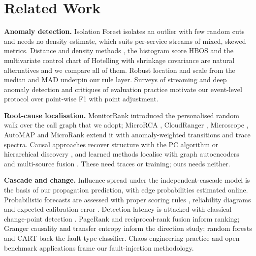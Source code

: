 \documentclass[journal]{IEEEtran}
\begin{document}
\section{Related Work}
\textbf{Anomaly detection.} Isolation Forest \cite{liu2008isolation,liu2012isolation} isolates an outlier with few random cuts
and needs no density estimate, which suits per-service streams of mixed, skewed metrics. Distance and density methods
\cite{ramaswamy2000efficient,breunig2000lof}, the histogram score HBOS \cite{goldstein2012hbos} and the multivariate control chart
of Hotelling \cite{hotelling1931,mahalanobis1936} with shrinkage covariance \cite{ledoit2004} are natural alternatives and we compare
all of them. Robust location and scale from the median and MAD \cite{hampel1974,rousseeuw1993} underpin our rule layer. Surveys of
streaming and deep anomaly detection \cite{gama2014survey,chandola2009survey} and critiques of evaluation practice
\cite{wu2021flawed,kim2022rigorous,tatbul2018precision} motivate our event-level protocol over point-wise F1 with point adjustment.

\textbf{Root-cause localisation.} MonitorRank \cite{kim2013monitorrank} introduced the personalised random walk over the call
graph that we adopt; MicroRCA \cite{wu2020microrca}, CloudRanger \cite{wang2018cloudranger}, Microscope \cite{lin2018microscope},
AutoMAP \cite{ma2020automap} and MicroRank \cite{yu2021microrank} extend it with anomaly-weighted transitions and trace spectra.
Causal approaches recover structure with the PC algorithm or hierarchical discovery \cite{ikram2022rcd,li2022circa,xin2023causalrca},
and learned methods localise with graph autoencoders and multi-source fusion
\cite{sun2024deephunt,zhang2023diagfusion,lee2023eadro,wang2021groot}. These need traces or training; ours needs neither.

\textbf{Cascade and change.} Influence spread under the independent-cascade model \cite{kempe2003influence} is the basis of our
propagation prediction, with edge probabilities estimated online. Probabilistic forecasts are assessed with proper scoring rules
\cite{brier1950verification}, reliability diagrams and expected calibration error
\cite{niculescu2005predicting,guo2017calibration}. Detection latency is attacked with classical change-point detection
\cite{page1954cusum,adams2007bocpd}. PageRank \cite{page1999pagerank} and reciprocal-rank fusion \cite{cormack2009rrf} inform ranking;
Granger causality \cite{granger1969} and transfer entropy \cite{schreiber2000te} inform the direction study; random forests and CART
\cite{breiman2001rf,breiman1984cart} back the fault-type classifier. Chaos-engineering practice \cite{basiri2016chaos} and open
benchmark applications \cite{gan2019deathstar,zhou2018trainticket} frame our fault-injection methodology.
\end{document}
